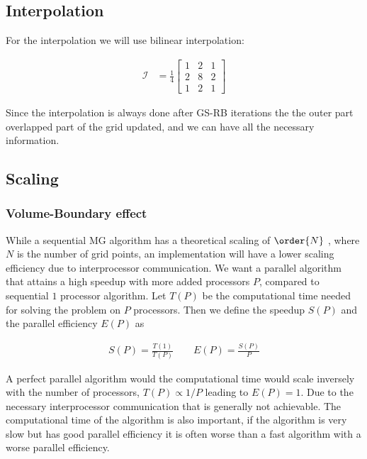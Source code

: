		\subsection{Interpolation}
			For the interpolation we will use bilinear interpolation:

			\begin{align}
				\mathcal{I} &= \frac{1}{4}
				\begin{bmatrix}
					1 & 2 & 1
					\\
					2 & 8 & 2
					\\
					1 & 2 & 1
				\end{bmatrix}
			\end{align}

			Since the interpolation is always done after GS-RB iterations the the outer part overlapped part of the grid updated, and we can have all the necessary information.

		\subsection{Scaling}
			\subsubsection{Volume-Boundary effect}
			While a sequential MG algorithm has a theoretical scaling of \(\order{N}\) \citep{Press1987}, where \(N\) is the number of grid points, an implementation will have a lower scaling efficiency due to interprocessor communication. We want a parallel algorithm that attains a high speedup with more added processors \(P\),  compared to sequential \(1\) processor algorithm. Let \(T(P)\) be the computational time needed for solving the problem on \(P\) processors. Then we define the speedup \(S(P)\) and the parallel efficiency \(E(P)\) as

			\begin{align}
				S(P) = \frac{T(1)}{T(P)} \qquad E(P) = \frac{S(P)}{P}
			\end{align} 

			A perfect parallel algorithm would the computational time would scale inversely with the number of processors, \(T(P) \propto 1/P\) leading to \( E(P) =1 \). Due to the necessary interprocessor communication that is generally not achievable. The computational time of the algorithm is also important, if the algorithm is very slow but has good parallel efficiency it is often worse than a fast algorithm with a worse parallel efficiency.

